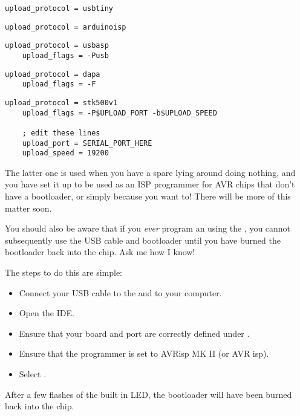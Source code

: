 \begin{lstlisting}[caption={The \inline{platformio.ini} additions for `USBTinyISP' Programmer}]
    upload_protocol = usbtiny
\end{lstlisting}


\begin{lstlisting}[caption={The \inline{platformio.ini} additions for `ArduinoISP` Programmer}]
    upload_protocol = arduinoisp
\end{lstlisting}


\begin{lstlisting}[caption={The \inline{platformio.ini} additions for `USBasp' ISP Programmer}]
    upload_protocol = usbasp
    upload_flags = -Pusb
\end{lstlisting}


\begin{lstlisting}[caption={The \inline{platformio.ini} additions for `Parallel Port' ISP Programmer}]
    upload_protocol = dapa
    upload_flags = -F
\end{lstlisting}


\begin{lstlisting}[caption={The \inline{platformio.ini} additions for `Arduino as ISP` Programmer}]
    upload_protocol = stk500v1
    upload_flags = -P$UPLOAD_PORT -b$UPLOAD_SPEED

    ; edit these lines
    upload_port = SERIAL_PORT_HERE
    upload_speed = 19200
\end{lstlisting}

The latter one is used when you have a spare   lying around doing nothing, and you have set it up to be used as an ISP programmer for AVR chips that don't have a bootloader, or simply because you want to! There will be more of this matter soon.

\begin{warning}
You should also be aware that if you \emph{ever} program an   using the , you cannot subsequently use the USB cable and bootloader until you have burned the bootloader back into the chip. Ask me how I know! 

The steps to do this are simple:

\begin{itemize}
\item Connect your USB cable to the   and to your computer.
\item Open the   IDE.
\item Ensure that your board and port are correctly defined under .
\item Ensure that the programmer is set to AVRisp MK II (or AVR isp).
\item Select .
\end{itemize}

After a few flashes of the built in LED, the bootloader will have been burned back into the chip. 
\end{warning}

